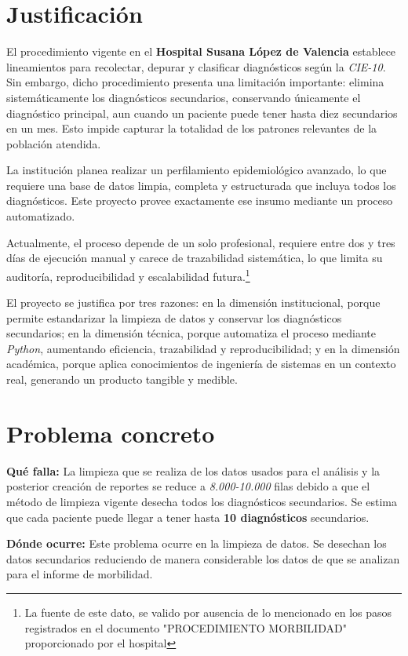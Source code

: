 \documentclass[12pt]{article}
\begin{document}
\section*{Justificación}

El procedimiento vigente en el \textbf{Hospital Susana López de Valencia} establece lineamientos para recolectar, depurar y clasificar diagnósticos según la \textit{CIE-10}. Sin embargo, dicho procedimiento presenta una limitación importante: elimina sistemáticamente los diagnósticos secundarios, conservando únicamente el diagnóstico principal, aun cuando un paciente puede tener hasta diez secundarios en un mes. Esto impide capturar la totalidad de los patrones relevantes de la población atendida.

La institución planea realizar un perfilamiento epidemiológico avanzado, lo que requiere una base de datos limpia, completa y estructurada que incluya todos los diagnósticos. Este proyecto provee exactamente ese insumo mediante un proceso automatizado.

Actualmente, el proceso depende de un solo profesional, requiere entre dos y tres días de ejecución manual y carece de trazabilidad sistemática, lo que limita su auditoría, reproducibilidad y escalabilidad futura.\footnote{La fuente de este dato, se valido por ausencia de lo mencionado en los pasos registrados en el documento "PROCEDIMIENTO MORBILIDAD" proporcionado por el hospital}

El proyecto se justifica por tres razones: en la dimensión institucional, porque permite estandarizar la limpieza de datos y conservar los diagnósticos secundarios; en la dimensión técnica, porque automatiza el proceso mediante \textit{Python}, aumentando eficiencia, trazabilidad y reproducibilidad; y en la dimensión académica, porque aplica conocimientos de ingeniería de sistemas en un contexto real, generando un producto tangible y medible.

\section*{Problema concreto}

\textbf{Qué falla:} La limpieza que se realiza de los datos usados para el análisis y la posterior creación de reportes se reduce a \textit{8.000-10.000} filas debido a que el método de limpieza vigente desecha todos los diagnósticos secundarios. Se estima que cada paciente puede llegar a tener hasta \textbf{10 diagnósticos} secundarios.

\textbf{Dónde ocurre:} Este problema ocurre en la limpieza de datos. Se desechan los datos secundarios reduciendo de manera considerable los datos de que se analizan para el informe de morbilidad.
\end{document}
